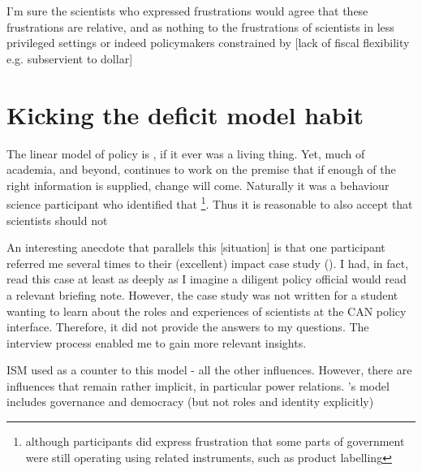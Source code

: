 I'm sure the scientists who expressed frustrations would agree that these frustrations are relative, and as nothing to the frustrations of scientists in less privileged settings or indeed policymakers constrained by [lack of fiscal flexibility e.g. subservient to dollar]


\section{Kicking the deficit model habit}\label{sec:disdeficit}
The linear model of policy is , if it ever was a living thing. Yet, much of academia, and beyond, continues to work on the premise that if enough of the right information is supplied, change will come. Naturally it was a behaviour science participant who identified that \footnote{although participants did express frustration that some parts of government were still operating using related instruments, such as product labelling}. Thus it is reasonable to also accept that scientists should not 

An interesting anecdote that parallels this [situation] is that one participant referred me several times to their (excellent) impact case study (). I had, in fact, read this case at least as deeply as I imagine a diligent policy official would read a relevant briefing note. However, the case study was not written for a student wanting to learn about the roles and experiences of scientists at the CAN policy interface. Therefore, it did not provide the answers to my questions. The interview process enabled me to gain more relevant insights.

ISM used as a counter to this model - all the other influences. However, there are influences that remain rather implicit, in particular power relations. \cite{HamptonW2023}'s model includes governance and democracy (but not roles and identity explicitly)

